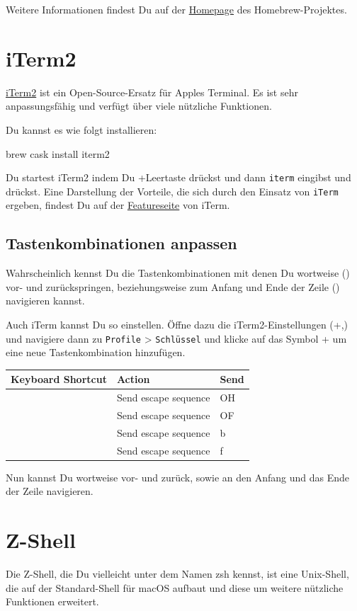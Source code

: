 \documentclass[]{article}
\newcommand{\code}[1]{\texttt{#1}}
\begin{document}
Weitere Informationen findest Du auf der \href{https://brew.sh/index_de}{Homepage} des Homebrew-Projektes.

\section{iTerm2}
\href{https://www.iterm2.com/}{iTerm2} ist ein Open-Source-Ersatz für Apples Terminal. Es ist sehr anpassungsfähig und verfügt über viele nützliche Funktionen.

Du kannst es wie folgt installieren:
\begin{bashcode}
brew cask install iterm2
\end{bashcode}

Du startest iTerm2 indem Du \cmdkey+Leertaste drückst und dann \code{iterm} eingibst und \returnkey\, drückst. Eine Darstellung der Vorteile, die sich durch den Einsatz von \code{iTerm} ergeben, findest Du auf der \href{https://www.iterm2.com/features.html}{Featureseite} von iTerm.

\subsection{Tastenkombinationen anpassen}
Wahrscheinlich kennst Du die Tastenkombinationen mit denen Du wortweise (\optkey) vor- und zurückspringen, beziehungsweise zum Anfang und Ende der Zeile (\cmdkey) navigieren kannst.

Auch iTerm kannst Du so einstellen. Öffne dazu die iTerm2-Einstellungen (\cmdkey +,) und navigiere dann zu \code{Profile} > \code{Schlüssel} und klicke  auf das Symbol +  um eine neue Tastenkombination hinzufügen.

\begin{tabular}[t]{lll}
	\toprule
	Keyboard Shortcut & Action & Send \\
	\midrule
	\cmdkey \textleftarrow & Send escape sequence & OH \\
	\cmdkey \textrightarrow & Send escape sequence & OF \\
	\optkey \textleftarrow & Send escape sequence & b \\
	\optkey \textrightarrow & Send escape sequence & f \\
\end{tabular}

Nun kannst Du wortweise vor- und zurück, sowie an den Anfang und das Ende der Zeile navigieren.

\section{Z-Shell}
Die Z-Shell, die Du vielleicht unter dem Namen zsh kennst, ist eine Unix-Shell, die auf der Standard-Shell für macOS aufbaut und diese um weitere nützliche Funktionen erweitert. 
\end{document}
